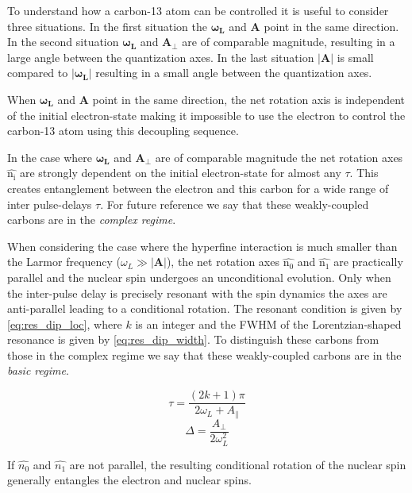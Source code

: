 To understand how a carbon-13 atom can be controlled it is useful to consider three situations. In the first situation the $\bm{\omega_L}$ and $\bm{A}$ point in the same direction. In the second situation $\bm{\omega_L}$ and $\bm{A_\perp}$ are of comparable magnitude, resulting in a large angle between the quantization axes. In the last situation $|\bm{A}|$ is small compared to  $\bm{|\omega_L|}$ resulting in a small angle between the quantization axes.

When $\bm{\omega_L}$ and $\bm{A}$ point in the same direction, the net rotation axis is independent of the initial electron-state making it impossible to use the electron to control the carbon-13 atom using this decoupling sequence.

In the case where $\bm{\omega_L}$ and $\bm{A_\perp}$ are of comparable magnitude the net rotation axes $\bm{\hat{\mathrm{n_i}}}$ are strongly dependent on the initial electron-state for almost any $\tau$. This creates entanglement between the electron and this carbon for a wide range of inter pulse-delays $\tau$. For future reference we say that these weakly-coupled carbons are in the \emph{complex regime}.

When considering the case where the hyperfine interaction is much smaller than the Larmor frequency ($\omega_L \gg |\bm{A}|$), the net rotation axes  $\hat{\mathrm{n_0}}$ and $\hat{\mathrm{n_1}}$ are practically parallel and the nuclear spin undergoes an unconditional evolution.
Only when the inter-pulse delay is precisely resonant with the spin dynamics the axes are anti-parallel leading to a conditional rotation\citep{Taminiau2012Detection}.
The resonant condition is given by \cref{eq:res_dip_loc}, where $k$ is an integer and the FWHM of the Lorentzian-shaped resonance is given by \cref{eq:res_dip_width}.
To distinguish these carbons from those in the complex regime we say that these weakly-coupled carbons are in the \emph{basic regime}.

 \begin{equation}
\tau = \frac{(2k+1)\pi}{2 \omega_L + A_\parallel}
\label{eq:res_dip_loc}
\end{equation}
 \begin{equation}
\Delta = \frac{A_\perp}{2 \omega_L^2}
\label{eq:res_dip_width}
\end{equation}

If  $\hat{n_0}$ and $\hat{n_1}$ are not parallel, the resulting conditional rotation of the nuclear spin generally entangles the electron and nuclear spins.

